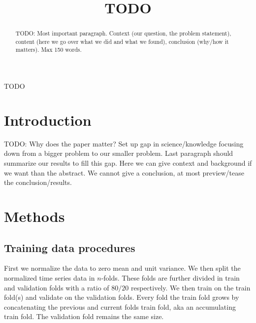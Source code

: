 \documentclass[conference]{IEEEtran}
\begin{document}
\title{TODO}

\author{
\and
{}
\and
{}
\and
{}
}

\maketitle

\begin{abstract}
TODO: Most important paragraph. Context (our question, the problem statement), content (here we go 
over what we did and what we found), conclusion (why/how it matters). Max 150 words.
\end{abstract}

\begin{IEEEkeywords}
TODO
\end{IEEEkeywords}

\section{Introduction}
TODO: Why does the paper matter? Set up gap in science/knowledge focusing down from a bigger 
problem to our smaller problem. Last paragraph should summarize our results to fill this gap. Here 
we can give context and background if we want than the abstract. We cannot give a conclusion, at 
most preview/tease the conclusion/results.



\section{Methods}
\subsection{Training data procedures}
First we normalize the data to zero mean and unit variance. We then split the normalized time 
series data in $n$-folds. These folds are further divided in train and validation folds with a 
ratio of $80/20$ respectively. We then train on the train fold(s) and validate on the validation 
folds. Every fold the train fold grows by concatenating the previous and current folds train fold, 
aka an accumulating train fold. The validation fold remains the same size.
\end{document}
